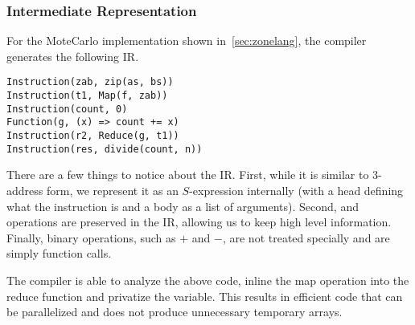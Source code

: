 \subsubsection{Intermediate Representation}

For the MoteCarlo implementation shown in~\ref{sec:zonelang}, the 
	compiler generates the following IR.

\begin{verbatim}
Instruction(zab, zip(as, bs))
Instruction(t1, Map(f, zab))
Instruction(count, 0)
Function(g, (x) => count += x)
Instruction(r2, Reduce(g, t1))
Instruction(res, divide(count, n))
\end{verbatim}

There are a few things to notice about the IR.
First, while it is similar to $3$-address form,
	we represent it as an $S$-expression internally 
	(with a head defining what the instruction is and a body
	as a list of arguments).
Second,  and  operations are preserved in the IR, 
	allowing us to keep high level information.
Finally, binary operations, such as $+$ and $-$, are not
	treated specially and are simply function calls.

The compiler is able to analyze the above code, inline the map operation
into the reduce function and privatize the  variable. This
results in efficient code that can be parallelized and does not produce
unnecessary temporary arrays.
